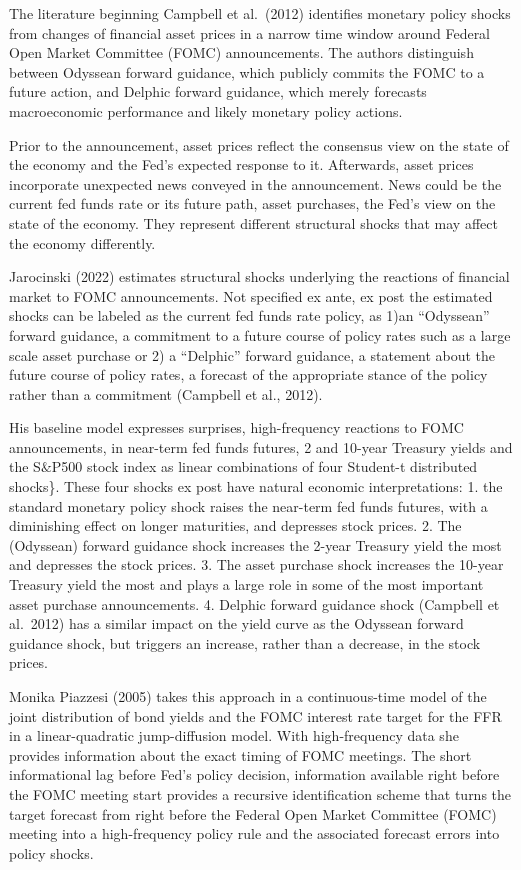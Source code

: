 \documentclass[
]{article}
\begin{document}
The literature beginning Campbell et al.~(2012) identifies monetary policy shocks from changes of financial asset prices in a narrow time window around Federal Open Market Committee (FOMC) announcements. The authors distinguish between Odyssean forward guidance, which publicly commits the FOMC to a future action, and Delphic forward guidance, which merely forecasts macroeconomic performance and likely monetary policy actions.

Prior to the announcement, asset prices reflect the consensus view on the state of the economy and the Fed's expected response to it. Afterwards, asset prices incorporate unexpected news conveyed in the announcement. News could be the current fed funds rate or its future path, asset purchases, the Fed's view on the state of the economy. They represent different structural shocks that may affect the economy differently.

Jarocinski (2022) estimates structural shocks underlying the reactions of financial market to FOMC announcements. Not specified ex ante, ex post the estimated shocks can be labeled as the current fed funds rate policy, as 1)an ``Odyssean'' forward guidance, a commitment to a future course of policy rates such as a large scale asset purchase or 2) a ``Delphic'' forward guidance, a statement about the future course of policy rates, a forecast of the appropriate stance of the policy rather than a commitment (Campbell et al., 2012).

His baseline model expresses surprises, high-frequency reactions to FOMC announcements, in near-term fed funds futures, 2 and 10-year Treasury yields and the S\(\&\)P500 stock index as linear combinations of four Student-t distributed shocks\}. These four shocks ex post have natural economic interpretations:
1. the standard monetary policy shock raises the near-term fed funds futures, with a diminishing effect on longer maturities, and depresses stock prices.
2. The (Odyssean) forward guidance shock increases the 2-year Treasury yield the most and depresses the stock prices.
3. The asset purchase shock increases the 10-year Treasury yield the most and plays a large role in some of the most important asset purchase announcements.
4. Delphic forward guidance shock (Campbell et al.~2012) has a similar impact on the yield curve as the Odyssean forward guidance shock, but triggers an increase, rather than a decrease, in the stock prices.

Monika Piazzesi (2005) takes this approach in a continuous-time model of the joint distribution of bond yields and the FOMC interest rate target for the FFR in a linear-quadratic jump-diffusion model. With high-frequency data she provides information about the exact timing of FOMC meetings. The short informational lag before Fed's policy decision, information available right before the FOMC meeting start provides a recursive identification scheme that turns the target forecast from right before the Federal Open Market Committee (FOMC) meeting into a high-frequency policy rule and the associated forecast errors into policy shocks.
\end{document}
